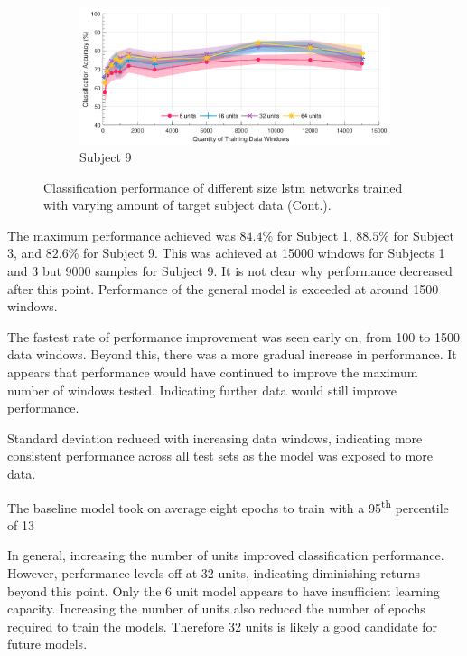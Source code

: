 \begin{figure}[t]\ContinuedFloat
    \begin{subfigure}[b]{\textwidth}
        \centering
        \includegraphics[width=\textwidth]{content/5-Personalisation/Bespoke_Target/ch5_bespoke_target_model_subject_9.pdf}
        \caption{Subject 9}
        \label{fig:ch5_32_unit_bespoke_model}
    \end{subfigure}
    \caption[]{Classification performance of different size \acrshort{lstm} networks trained with varying amount of target subject data (Cont.).}
\end{figure}

The maximum performance achieved was $84.4\%$ for Subject 1, $88.5\%$ for Subject 3, and $82.6\%$ for Subject 9. This was achieved at 15000 windows for Subjects 1 and 3 but 9000 samples for Subject 9. It is not clear why performance decreased after this point. Performance of the general model is exceeded at around 1500 windows.

The fastest rate of performance improvement was seen early on, from 100 to 1500 data windows. Beyond this, there was a more gradual increase in performance. It appears that performance would have continued to improve the maximum number of windows tested. Indicating further data would still improve performance.

Standard deviation reduced with increasing data windows, indicating more consistent performance across all test sets as the model was exposed to more data.

The baseline model took on average eight epochs to train with a 95\textsuperscript{th} percentile of 13

In general, increasing the number of units improved classification performance. However, performance levels off at 32 units, indicating diminishing returns beyond this point. Only the 6 unit model appears to have insufficient learning capacity. Increasing the number of units also reduced the number of epochs required to train the models. Therefore 32 units is likely a good candidate for future models.

